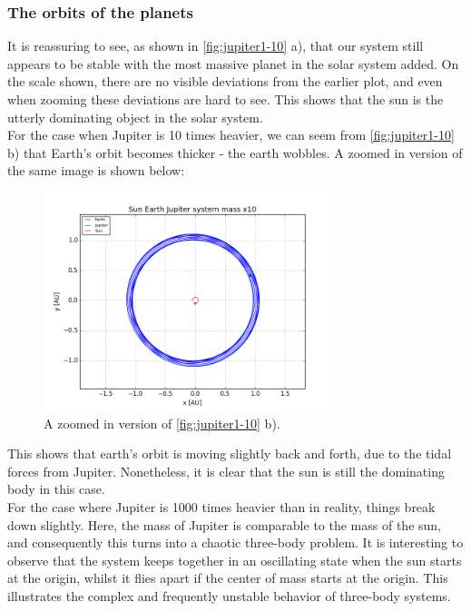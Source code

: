 \documentclass[a4paper, 10pt]{article}
\begin{document}
\subsubsection{The orbits of the planets}
It is reassuring to see, as shown in \cref{fig:jupiter1-10} a), that our system still appears to be stable with the most massive planet in the solar system added. On the scale shown, there are no visible deviations from the earlier plot, and even when zooming these deviations are hard to see. This shows that the sun is the utterly dominating object in the solar system.\\
\linebreak
For the case when Jupiter is 10 times heavier, we can seem from \cref{fig:jupiter1-10} b) that Earth's orbit becomes thicker - the earth wobbles. A zoomed in version of the same image is shown below:
\begin{figure}[!ht]
    \centering
    \includegraphics[height=2.5in]{orbitESJ10Close.png}
    \caption{A zoomed in version of \cref{fig:jupiter1-10} b).}
\end{figure}
\linebreak
This shows that earth's orbit is moving slightly back and forth, due to the tidal forces from Jupiter. Nonetheless, it is clear that the sun is still the dominating body in this case.\\
\linebreak
For the case where Jupiter is 1000 times heavier than in reality, things break down slightly. Here, the mass of Jupiter is comparable to the mass of the sun, and consequently this turns into a chaotic three-body problem. It is interesting to observe that the system keeps together in an oscillating state when the sun starts at the origin, whilst it flies apart if the center of mass starts at the origin. This illustrates the complex and frequently unstable behavior of three-body systems. 
\end{document}
